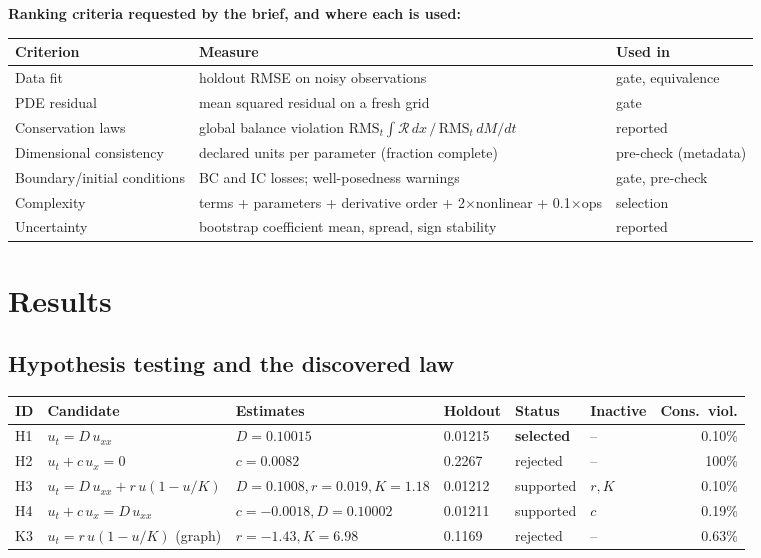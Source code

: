 \documentclass[11pt,a4paper]{article}
\begin{document}
\textbf{Ranking criteria requested by the brief, and where each is used:}
\begin{center}
\small
\begin{tabular}{@{}L{3.3cm}L{9.0cm}L{3.0cm}@{}}
\toprule
\textbf{Criterion} & \textbf{Measure} & \textbf{Used in} \\ \midrule
Data fit & holdout RMSE on noisy observations & gate, equivalence \\
PDE residual & mean squared residual on a fresh grid & gate \\
Conservation laws & global balance violation $\mathrm{RMS}_t\!\int\!\mathcal R\,dx \,/\, \mathrm{RMS}_t\, dM/dt$ & reported \\
Dimensional consistency & declared units per parameter (fraction complete) & pre-check (metadata) \\
Boundary/initial conditions & BC and IC losses; well-posedness warnings & gate, pre-check \\
Complexity & terms + parameters + derivative order + 2$\times$nonlinear + 0.1$\times$ops & selection \\
Uncertainty & bootstrap coefficient mean, spread, sign stability & reported \\
\bottomrule
\end{tabular}
\end{center}

\section{Results}

\subsection{Hypothesis testing and the discovered law}

\begin{center}
\footnotesize
\setlength{\tabcolsep}{3.5pt}
\begin{tabular}{@{}llllllr@{}}
\toprule
\textbf{ID} & \textbf{Candidate} & \textbf{Estimates} & \textbf{Holdout} & \textbf{Status} & \textbf{Inactive} & \textbf{Cons.\ viol.} \\ \midrule
H1 & $u_t = D\,u_{xx}$ & $D=0.10015$ & 0.01215 & \textbf{selected} & -- & 0.10\% \\
H2 & $u_t + c\,u_x = 0$ & $c=0.0082$ & 0.2267 & rejected & -- & 100\% \\
H3 & $u_t = D\,u_{xx} + r\,u(1-u/K)$ & $D{=}0.1008, r{=}0.019, K{=}1.18$ & 0.01212 & supported & $r, K$ & 0.10\% \\
H4 & $u_t + c\,u_x = D\,u_{xx}$ & $c{=}{-0.0018}, D{=}0.10002$ & 0.01211 & supported & $c$ & 0.19\% \\
K3 & $u_t = r\,u(1-u/K)$ (graph) & $r{=}{-1.43}, K{=}6.98$ & 0.1169 & rejected & -- & 0.63\% \\
\bottomrule
\end{tabular}
\end{center}
\end{document}
